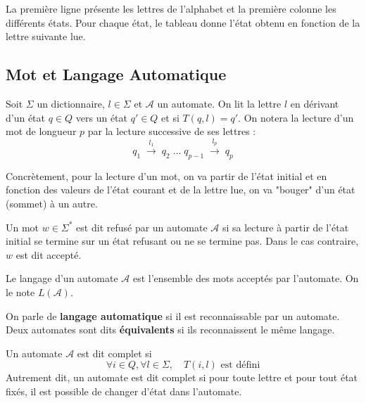 \begin{example}
\begin{multicols}{2}
        La première ligne présente les lettres de l'alphabet et la première colonne les différents états. 
        Pour chaque état, le tableau donne l'état obtenu en fonction de la lettre suivante lue. 
    \end{multicols}
\end{example}

\subsection{Mot et Langage Automatique}


\begin{definition}
    Soit $\Sigma$ un dictionnaire, $l \in \Sigma$ et $\mathcal{A}$ un automate. 
    On lit la lettre $l$ en dérivant d'un état $q \in Q$ vers un état $q' \in Q$ et si $T(q,l) = q'$. 
    On notera la lecture d'un mot de longueur $p$ par la lecture successive de ses lettres :
        \[ q_1 \;  \overset{l_1}{\longrightarrow} \; q_2 \; \dots \; q_{p-1} \; \overset{l_p}{\longrightarrow} \; q_p \] 
\end{definition}

Concrètement, pour la lecture d'un mot, on va partir de l'état initial et en fonction des valeurs de l'état courant et de 
la lettre lue, on va "bouger" d'un état (sommet) à un autre.

\begin{definition}
    Un mot $w \in \Sigma^*$ est dit refusé par un automate $\mathcal{A}$ si sa lecture à partir de l'état initial 
    se termine sur un état refusant ou ne se termine pas. Dans le cas contraire, $w$ est dit accepté. 
\end{definition}

\begin{definition}
    Le langage d'un automate $\mathcal{A}$ est l'ensemble des mots acceptés par l'automate. 
    On le note $L(\mathcal{A})$. 
\end{definition}

On parle de \textbf{langage automatique} si il est reconnaissable par un automate. 
Deux automates sont dits \textbf{équivalents} si ils reconnaissent le même langage. 

\begin{definition}
    Un automate $\mathcal{A}$ est dit complet si 
        \[ \forall i \in Q, \forall l \in \Sigma, \quad T(i,l) \text{ est défini} \] 
    Autrement dit, un automate est dit complet si pour toute lettre et pour tout état fixés, il est possible de 
    changer d'état dans l'automate.  
\end{definition} 

